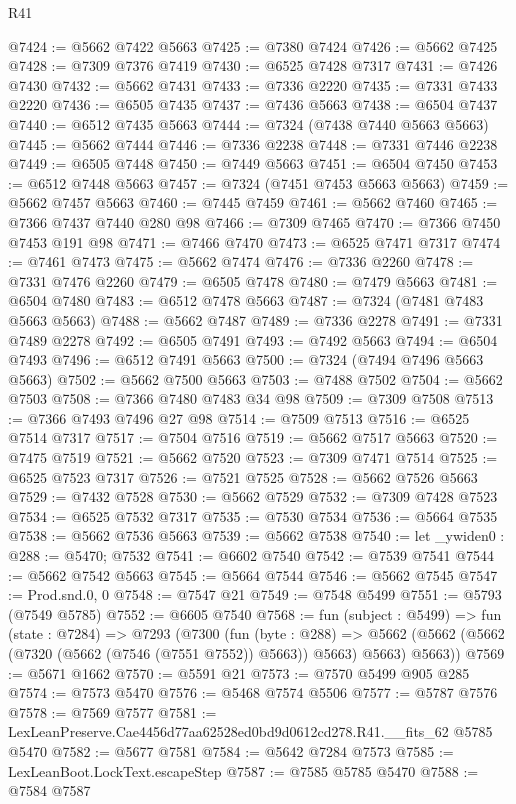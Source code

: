 \begin{lexlean}{R41}
\begin{coremodule}
@7424 := @5662 @7422 @5663
@7425 := @7380 @7424
@7426 := @5662 @7425
@7428 := @7309 @7376 @7419
@7430 := @6525 @7428 @7317
@7431 := @7426 @7430
@7432 := @5662 @7431
@7433 := @7336 @2220
@7435 := @7331 @7433 @2220
@7436 := @6505 @7435
@7437 := @7436 @5663
@7438 := @6504 @7437
@7440 := @6512 @7435 @5663
@7444 := @7324 (@7438 @7440 @5663 @5663)
@7445 := @5662 @7444
@7446 := @7336 @2238
@7448 := @7331 @7446 @2238
@7449 := @6505 @7448
@7450 := @7449 @5663
@7451 := @6504 @7450
@7453 := @6512 @7448 @5663
@7457 := @7324 (@7451 @7453 @5663 @5663)
@7459 := @5662 @7457 @5663
@7460 := @7445 @7459
@7461 := @5662 @7460
@7465 := @7366 @7437 @7440 @280 @98
@7466 := @7309 @7465
@7470 := @7366 @7450 @7453 @191 @98
@7471 := @7466 @7470
@7473 := @6525 @7471 @7317
@7474 := @7461 @7473
@7475 := @5662 @7474
@7476 := @7336 @2260
@7478 := @7331 @7476 @2260
@7479 := @6505 @7478
@7480 := @7479 @5663
@7481 := @6504 @7480
@7483 := @6512 @7478 @5663
@7487 := @7324 (@7481 @7483 @5663 @5663)
@7488 := @5662 @7487
@7489 := @7336 @2278
@7491 := @7331 @7489 @2278
@7492 := @6505 @7491
@7493 := @7492 @5663
@7494 := @6504 @7493
@7496 := @6512 @7491 @5663
@7500 := @7324 (@7494 @7496 @5663 @5663)
@7502 := @5662 @7500 @5663
@7503 := @7488 @7502
@7504 := @5662 @7503
@7508 := @7366 @7480 @7483 @34 @98
@7509 := @7309 @7508
@7513 := @7366 @7493 @7496 @27 @98
@7514 := @7509 @7513
@7516 := @6525 @7514 @7317
@7517 := @7504 @7516
@7519 := @5662 @7517 @5663
@7520 := @7475 @7519
@7521 := @5662 @7520
@7523 := @7309 @7471 @7514
@7525 := @6525 @7523 @7317
@7526 := @7521 @7525
@7528 := @5662 @7526 @5663
@7529 := @7432 @7528
@7530 := @5662 @7529
@7532 := @7309 @7428 @7523
@7534 := @6525 @7532 @7317
@7535 := @7530 @7534
@7536 := @5664 @7535
@7538 := @5662 @7536 @5663
@7539 := @5662 @7538
@7540 := let _ywiden0 : @288 := @5470; @7532
@7541 := @6602 @7540
@7542 := @7539 @7541
@7544 := @5662 @7542 @5663
@7545 := @5664 @7544
@7546 := @5662 @7545
@7547 := Prod.snd.{0, 0}
@7548 := @7547 @21
@7549 := @7548 @5499
@7551 := @5793 (@7549 @5785)
@7552 := @6605 @7540
@7568 := fun (subject : @5499) =>
  fun (state : @7284) =>
  @7293
    (@7300
      (fun (byte : @288) =>
      @5662 (@5662 (@5662 (@7320 (@5662 (@7546 (@7551 @7552)) @5663)) @5663) @5663) @5663))
@7569 := @5671 @1662
@7570 := @5591 @21
@7573 := @7570 @5499 @905 @285
@7574 := @7573 @5470
@7576 := @5468 @7574 @5506
@7577 := @5787 @7576
@7578 := @7569 @7577
@7581 := LexLeanPreserve.Cae4456d77aa62528ed0bd9d0612cd278.R41.__fits_62 @5785 @5470
@7582 := @5677 @7581
@7584 := @5642 @7284 @7573
@7585 := LexLeanBoot.LockText.escapeStep
@7587 := @7585 @5785 @5470
@7588 := @7584 @7587

\end{coremodule}
\end{lexlean}
